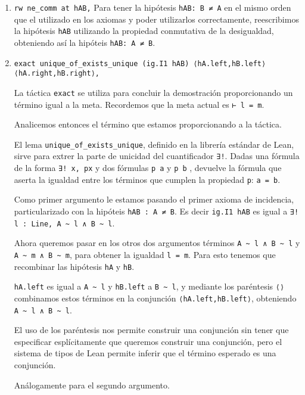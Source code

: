 \begin{enumerate}[label=L.\arabic*, topsep=0mm]
	\item \lstinline{rw ne_comm at hAB,} Para tener la hipótesis
	      \lstinline{hAB: B ≠ A} en el mismo orden que el utilizado en los axiomas y
	      poder utilizarlos correctamente, reescribimos la hipótesis \lstinline{hAB}
	      utilizando la propiedad conmutativa de la desigualdad, obteniendo así la
	      hipóteis \lstinline{hAB: A ≠ B}.

	\item \lstinline{exact unique_of_exists_unique (ig.I1 hAB) ⟨hA.left,hB.left⟩ ⟨hA.right,hB.right⟩,}

	      La táctica \lstinline{exact} se utiliza para concluir la demostración
	      proporcionando un término igual a la meta. Recordemos que la meta actual
	      es \lstinline{⊢ l = m}.

	      Analicemos entonces el término que estamos proporcionando a la táctica.

	      El lema \lstinline{unique_of_exists_unique}, definido en la librería
	      estándar de Lean, sirve para extrer la parte de unicidad del cuantificador
	      \lstinline{∃!}. Dadas una fórmula de la forma \lstinline{∃! x, px} y dos
	      fórmulas \lstinline{p a} y \lstinline{p b} , devuelve la fórmula que
	      aserta la igualdad entre los términos que cumplen la propiedad
	      \lstinline{p}: \lstinline{a = b}.

	      Como primer argumento le estamos pasando el primer axioma de incidencia,
	      particularizado con la hipóteis \lstinline{hAB : A ≠ B}. Es decir
	      \lstinline{ig.I1 hAB} es igual a \lstinline{∃! l : Line, A ~ l ∧ B ~ l}.

	      Ahora queremos pasar en los otros dos argumentos términos
	      \lstinline{A ~ l ∧ B ~ l} y \lstinline{A ~ m ∧ B ~ m}, para obtener la
	      igualdad \lstinline{l = m}. Para esto tenemos que recombinar las hipótesis
	      \lstinline{hA} y \lstinline{hB}.

	      \lstinline{hA.left} es igual a \lstinline{A ~ l} y \lstinline{hB.left} a
	      \lstinline{B ~ l}, y mediante los paréntesis \lstinline{⟨⟩} combinamos
	      estos términos en la conjunción \lstinline{⟨hA.left,hB.left⟩}, obteniendo
	      \lstinline{A ~ l ∧ B ~ l}.

	      El uso de los paréntesis nos permite construir una conjunción sin tener
	      que especificar esplícitamente que queremos construir una conjunción, pero
	      el sistema de tipos de Lean permite inferir que el término esperado es una
	      conjunción.

	      Análogamente para el segundo argumento.
\end{enumerate}

